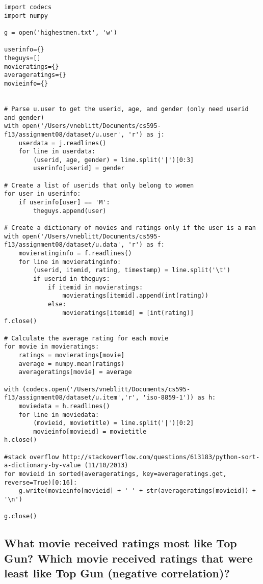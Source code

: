 \documentclass{article}
\begin{document}
\begin{lstlisting}[frame=single, caption=highestmen.py, label=highmen]
import codecs
import numpy

g = open('highestmen.txt', 'w')

userinfo={}
theguys=[]
movieratings={}
averageratings={}
movieinfo={}


# Parse u.user to get the userid, age, and gender (only need userid and gender)
with open('/Users/vneblitt/Documents/cs595-f13/assignment08/dataset/u.user', 'r') as j:
	userdata = j.readlines()
	for line in userdata:
		(userid, age, gender) = line.split('|')[0:3]
		userinfo[userid] = gender

# Create a list of userids that only belong to women
for user in userinfo:
	if userinfo[user] == 'M':
		theguys.append(user)

# Create a dictionary of movies and ratings only if the user is a man
with open('/Users/vneblitt/Documents/cs595-f13/assignment08/dataset/u.data', 'r') as f:
	movieratinginfo = f.readlines()
	for line in movieratinginfo:
		(userid, itemid, rating, timestamp) = line.split('\t')
		if userid in theguys:
			if itemid in movieratings:
				movieratings[itemid].append(int(rating))
			else:
				movieratings[itemid] = [int(rating)]
f.close()

# Calculate the average rating for each movie
for movie in movieratings:
	ratings = movieratings[movie]
	average = numpy.mean(ratings)
	averageratings[movie] = average

with (codecs.open('/Users/vneblitt/Documents/cs595-f13/assignment08/dataset/u.item','r', 'iso-8859-1')) as h:
	moviedata = h.readlines()
	for line in moviedata:
		(movieid, movietitle) = line.split('|')[0:2]
		movieinfo[movieid] = movietitle
h.close()

#stack overflow http://stackoverflow.com/questions/613183/python-sort-a-dictionary-by-value (11/10/2013)
for movieid in sorted(averageratings, key=averageratings.get, reverse=True)[0:16]:
	g.write(movieinfo[movieid] + ' ' + str(averageratings[movieid]) + '\n')

g.close()
\end{lstlisting}


\newpage
\subsection{What movie received ratings most like Top Gun? Which movie received ratings that were least like Top Gun (negative correlation)?}
\end{document}
